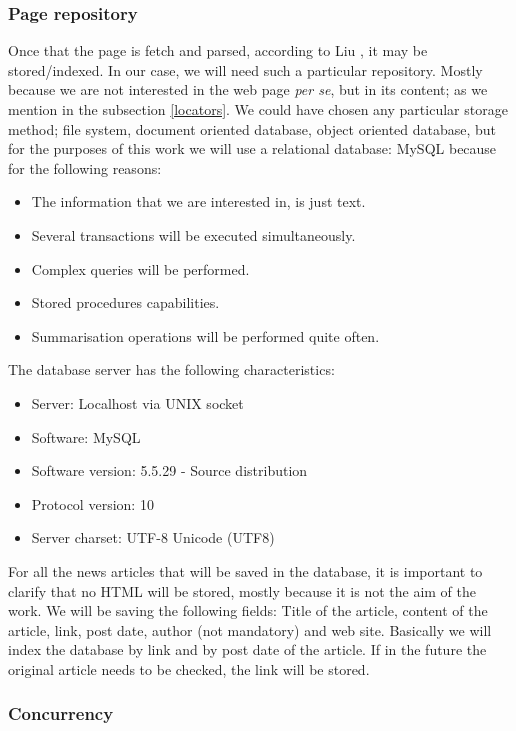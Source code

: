 \subsubsection{Page repository}\label{pageRepository}
Once that the page is fetch and parsed, according to Liu \cite%
{L2011}, it may be stored/indexed. In our case, we will need such a particular repository. Mostly because we are not interested in the web page \emph{per se}, but in its content; as we mention in the subsection \ref{locators}. We could have chosen any particular storage method; file system, document oriented database, object oriented database, but for the purposes of this work we will use a relational database: MySQL because for the following reasons:

\begin{itemize}
    \item The information that we are interested in, is just text.
    \item Several transactions will be executed simultaneously.
    \item Complex queries will be performed.
    \item Stored procedures capabilities.
    \item Summarisation operations will be performed quite often.
\end{itemize}

The database server has the following characteristics:

\begin{itemize}
    \item Server: Localhost via UNIX socket
    \item Software: MySQL
    \item Software version: 5.5.29 - Source distribution
    \item Protocol version: 10
    \item Server charset: UTF-8 Unicode (UTF8)
\end{itemize}

For all the news articles that will be saved in the database, it is important to clarify that no HTML will be stored, mostly because it is not the aim of the work. We will be saving the following fields: Title of the article, content of the article, link, post date, author (not mandatory) and web site. Basically we will index the database by link and by post date of the article. If in the future the original article needs to be checked, the link will be stored.

\subsubsection{Concurrency}\label{concurrency}

